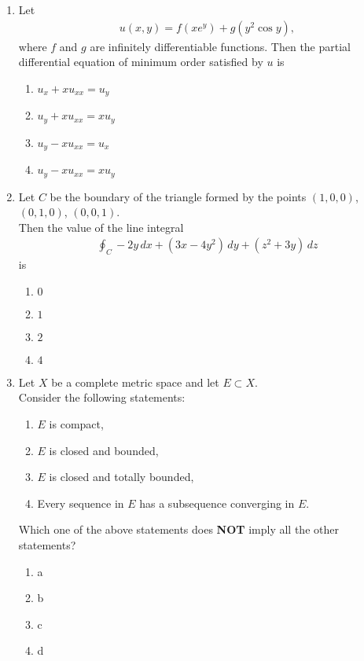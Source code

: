 \documentclass[journal]{IEEEtran}
\numberwithin{equation}{enumi}
\numberwithin{figure}{enumi}
\begin{document}
\begin{enumerate}
\item Let
\begin{align*}
u(x,y) = f(xe^y) + g(y^2 \cos y),
\end{align*}
where $f$ and $g$ are infinitely differentiable functions. Then the partial differential equation of minimum order satisfied by $u$ is 
\hfill{}
\begin{multicols}{2}
    \begin{enumerate}
        \item  $u_x + x u_{xx} = u_y$
        \item  $u_y + x u_{xx} = x u_y$
        \item  $u_y - x u_{xx} = u_x$ 
        \item  $u_y - x u_{xx} = x u_y$
    \end{enumerate}
    \end{multicols}


\item Let $C$ be the boundary of the triangle formed by the points $(1,0,0)$, $(0,1,0)$, $(0,0,1)$.\\
Then the value of the line integral    \hfill{}
\begin{align*}
\oint_C -2y\,dx + (3x - 4y^2)\,dy + (z^2 + 3y)\,dz
\end{align*}
is
\begin{multicols}{4}
\begin{enumerate}
    \item $0$
    \item $1$
    \item $2$
    \item $4$
\end{enumerate}
\end{multicols}


\item Let $X$ be a complete metric space and let $E \subset X$.
\\Consider the following statements:   \hfill{}

\begin{enumerate}
  \item $E$ is compact,
  \item $E$ is closed and bounded,
  \item $E$ is closed and totally bounded,
  \item Every sequence in $E$ has a subsequence converging in $E$.
\end{enumerate}


Which one of the above statements does \textbf{NOT} imply all the other statements?
\begin{multicols}{4}
\begin{enumerate}
    \item a
    \item b
    \item c
    \item d
\end{enumerate}
\end{multicols}



\end{enumerate}
\end{document}
